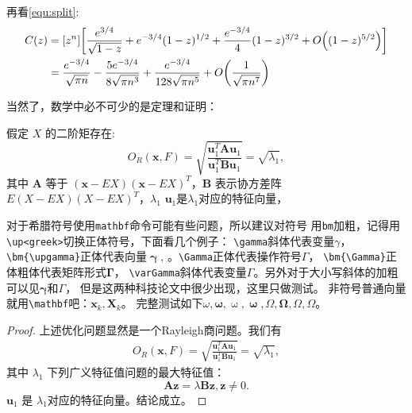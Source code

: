 {再看\ref{equ:split}:
\begin{equation}\label{equ:split}
\begin{split}
C(z) &= [z^n] \biggl[\frac{e^{3/4}}{\sqrt{1-z}} +
e^{-3/4}(1-z)^{1/2} + \frac{e^{-3/4}}{4}(1-z)^{3/2}
+ O\Bigl( (1-z)^{5/2}\Bigr)\biggr] \\
&= \frac{e^{-3/4}}{\sqrt{\pi n}} - \frac{5e^{-3/4}}{8\sqrt{\pi
n^3}} + \frac{e^{-3/4}}{128 \sqrt{\pi n^5}} +
O\biggl(\frac{1}{\sqrt{\pi
n^7}}\biggr)
\end{split}
\end{equation}

当然了，数学中必不可少的是定理和证明：
\begin{theorem}
  \label{chapTSthm:rayleigh solution}
  假定 $X$ 的二阶矩存在:
  \begin{equation}
         O_R(\mathbf{x},F)=\sqrt{\frac{\mathbf{u}_1^T\mathbf{A}\mathbf{u}_1} {\mathbf{u}_1^T\mathbf{B}\mathbf{u}_1}}=\sqrt{\lambda_1},
  \end{equation}
  其中 $\mathbf{A}$ 等于 $(\mathbf{x}-EX)(\mathbf{x}-EX)^T$，$\mathbf{B}$ 表示协方差阵 $E(X-EX)(X-EX)^T$，$\lambda_1$
$\mathbf{u}_1$是$\lambda_1$对应的特征向量，
\end{theorem}

对于希腊符号使用\verb|mathbf|命令可能有些问题，所以建议对符号
用\verb|bm|加粗，记得用\verb|\up<greek>|切换正体符号，下面看几个例子：
\verb|\gamma|斜体代表变量$\gamma$，\verb|\bm{\upgamma}|正体代表向量$\bm{\upgamma}$,
。\verb|\Gamma|正体代表操作符号$\Gamma$，
\verb|\bm{\Gamma}|正体粗体代表矩阵形式$\bm{\Gamma}$，
\verb|\varGamma|斜体代表变量$\varGamma$。另外对于大小写斜体的加粗可以见$\bm{\gamma}$和$\bm{\varGamma}$，
但是这两种科技论文中很少出现，这里只做测试。
非符号普通向量就用\verb|\mathbf|吧：$\mathbf{x}_k,\mathbf{X}_k$。
完整测试如下$\omega,\bm{\omega},\upomega,\bm{\upomega},\Omega,\bm{\Omega},\varOmega,\bm{\varOmega}$。

\begin{proof}
上述优化问题显然是一个Rayleigh商问题。我们有
  \begin{align}
     O_R(\mathbf{x},F)=\sqrt{\frac{\mathbf{u}_1^T\mathbf{A}\mathbf{u}_1} {\mathbf{u}_1^T\mathbf{B}\mathbf{u}_1}}=\sqrt{\lambda_1},
 \end{align}
 其中 $\lambda_1$ 下列广义特征值问题的最大特征值：
$$
\mathbf{A}\mathbf{z}=\lambda\mathbf{B}\mathbf{z}, \mathbf{z}\neq 0.
$$
 $\mathbf{u}_1$ 是 $\lambda_1$对应的特征向量。结论成立。
\end{proof}

}
